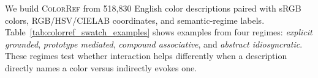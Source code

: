 \documentclass[11pt]{article}
\begin{document}
We build \textsc{ColorRef} from 518{,}830 English color descriptions paired
with sRGB colors, RGB/HSV/CIELAB coordinates, and semantic-regime labels.
Table~\ref{tab:colorref_swatch_examples} shows examples from four regimes:
\textit{explicit grounded}, \textit{prototype mediated},
\textit{compound associative}, and \textit{abstract idiosyncratic}. These
regimes test whether interaction helps differently when a description
directly names a color versus indirectly evokes one.




\end{document}
